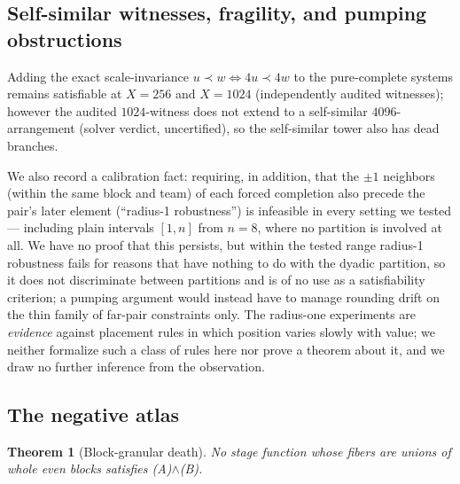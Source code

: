 \documentclass[11pt]{article}
\newtheorem{theorem}{Theorem}
\theoremstyle{definition}
\begin{document}
\subsection{Self-similar witnesses, fragility, and pumping obstructions}

Adding the exact scale-invariance $u \prec w \iff 4u \prec 4w$ to the
pure-complete systems remains satisfiable at $X = 256$ and $X = 1024$
(independently audited witnesses); however the audited $1024$-witness does not
extend to a self-similar $4096$-arrangement (solver verdict, uncertified),
so the self-similar tower also has dead branches.

We also record a calibration fact: requiring, in addition, that the $\pm 1$
neighbors (within the same block and team) of each forced completion also
precede the pair's later element (``radius-1 robustness'') is infeasible in
every setting we tested --- including plain intervals $[1, n]$ from $n = 8$,
where no partition is involved at all. We have no proof that this persists,
but within the tested range radius-1 robustness fails for reasons that have
nothing to do with the dyadic partition, so it does not discriminate between
partitions and is of no use as a satisfiability criterion; a pumping
argument would instead have to manage
rounding drift on the thin family of far-pair constraints only. The
radius-one experiments are \emph{evidence} against placement rules in which
position varies slowly with value; we neither formalize such a class of
rules here nor prove a theorem about it, and we draw no further inference
from the observation.

\subsection{The negative atlas}\label{sec:negative}

\begin{theorem}[Block-granular death]\label{thm:blockgranular}
No stage function whose fibers are unions of whole even blocks satisfies
(A)$\wedge$(B).
\end{theorem}
\end{document}
